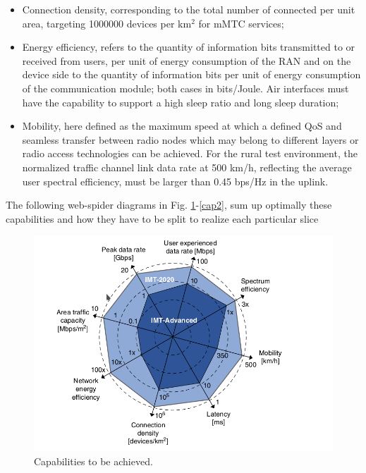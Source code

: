 \documentclass[a4paper,12pt]{report} %
\begin{document}
\begin{itemize}
\item Connection density, corresponding to the total number of connected 
per unit area, targeting 1000000 devices per km$^2$ for mMTC services;
\end{itemize}
\begin{itemize}
\item Energy efficiency, refers to the quantity of information bits transmitted to or received from users, per unit of energy consumption of the RAN and on the device side to the
quantity of information bits per unit of energy consumption of the communication module; both cases in bits/Joule. Air interfaces must have the capability to support a high sleep ratio and long sleep duration;
\end{itemize}
\begin{itemize}
\item Mobility, here defined as the maximum speed at which a defined QoS and
seamless transfer between radio nodes which may belong to different layers or radio access
technologies can be achieved. For the rural test environment, the normalized traffic channel link
data rate at 500 km/h, reflecting the average user spectral efficiency, must be larger than 0.45 bps/Hz
in the uplink.
\end{itemize}
The following web-spider diagrams in Fig. \ref{cap1}-\ref{cap2}, sum up optimally these capabilities and how they have to be split to realize each particular slice
\begin{figure}[h]
\centering
\includegraphics[scale=0.4]{pics/capabilities1.png}
\caption{Capabilities to be achieved. \cite{al20185g}} 
\label{cap1}
\end{figure}
\end{document}
